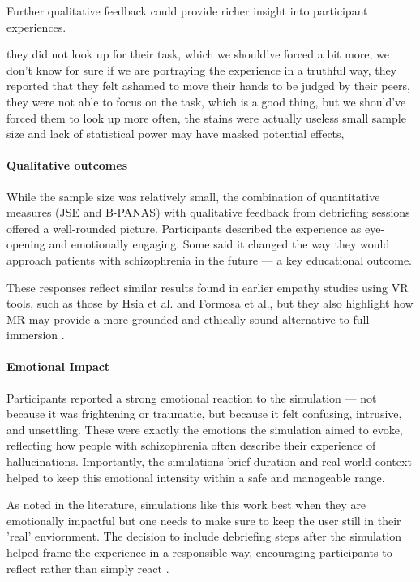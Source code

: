 Further qualitative feedback could provide richer insight into participant experiences.


they did not look up for their task, which we should've forced a bit more,
we don't know for sure if we are portraying the experience in a truthful way,
they reported that they felt ashamed to move their hands to be judged by their peers,
they were not able to focus on the task, which is a good thing, but we should've forced them to look up more often,
the stains were actually useless
small sample size and lack of statistical power may have masked potential effects,


\paragraph{Qualitative outcomes}
While the sample size was relatively small, the combination of quantitative measures (JSE and B-PANAS) with qualitative feedback from debriefing sessions offered a well-rounded picture. Participants described the experience as eye-opening and emotionally engaging. Some said it changed the way they would approach patients with schizophrenia in the future — a key educational outcome.

\vspace{1em}

These responses reflect similar results found in earlier empathy studies using VR tools, such as those by Hsia et al. and Formosa et al., but they also highlight how MR may provide a more grounded and ethically sound alternative to full immersion \cite{Hsia2022, Formosa2018}.

\paragraph{Emotional Impact}

Participants reported a strong emotional reaction to the simulation — not because it was frightening or traumatic, but because it felt confusing, intrusive, and unsettling. These were exactly the emotions the simulation aimed to evoke, reflecting how people with schizophrenia often describe their experience of hallucinations. Importantly, the simulations brief duration and real-world context helped to keep this emotional intensity within a safe and manageable range.

\vspace{1em}

As noted in the literature, simulations like this work best when they are emotionally impactful but one needs to make sure to keep the user still in their 'real' enviornment. The decision to include debriefing steps after the simulation helped frame the experience in a responsible way, encouraging participants to reflect rather than simply react \cite{Rueda2020, Ando2011}.

